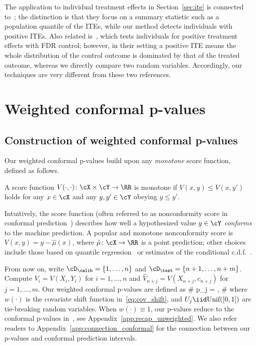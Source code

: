 The application to individual treatment effects in Section~\ref{sec:ite}
is connected to~\cite{caughey2021randomization};
the distinction is that they focus on a summary statistic such as
a population quantile of the ITEs,
while our method {detects individuals with positive ITEs.}
Also related is~\cite{duan2021interactive},
which tests individuals for positive treatment effects
with FDR control; however, in their setting a positive ITE
means the whole distribution  of
the control outcome is dominated by that of the treated outcome,
whereas we
directly compare two random variables.
Accordingly, our techniques are very different from these two references.
\section{Weighted conformal p-values}
\label{sec:pval}
\subsection{Construction of weighted conformal p-values}

Our weighted conformal p-values build upon
any \emph{monotone} score function, defined as follows.

\begin{definition}[Monotonicity]
    \label{def:monotone}
A score function $V(\cdot,\cdot)\colon \cX\times\cY\to \RR$ is monotone if
$V(x,y)\leq V(x,y')$ holds for any $x\in \cX$ and any $y,y'\in \cY$ obeying $y\leq y'$.
\end{definition}


Intuitively, the score function (often referred to as nonconformity score
in conformal prediction~\cite{vovk2005algorithmic})
describes how well a hypothesized value $y\in \cY$
\emph{conforms} to the machine prediction.
A popular and monotone nonconformity score
is $V(x,y) = y-\hat\mu(x)$, where $\hat\mu\colon\cX\to \RR$ is
a point prediction; other choices include those based on
quantile regression~\cite{romano2019conformalized} or estimates of the conditional
c.d.f.~\cite{chernozhukov2021distributional}.

{From now on, write $\cD_\calib = \{1,\dots,n\}$ and $\cD_\test=\{n+1,\dots,n+m\}$.
Compute $V_i=V(X_i,Y_i)$ for $i=1,\dots,n$  and
$\hat{V}_{n+j}=V(X_{n+j},c_{n+j})$ for $j=1,\dots,m$.
Our weighted conformal p-values are defined as
\#\label{eq:def_wcpval_rand}
p_j = ,
\#
where $w(\cdot)$ is the covariate shift function in~\eqref{eq:cov_shift},
and  $U_j\iid \textrm{Unif}([0,1])$ are tie-breaking random variables.
When $w(\cdot)\equiv 1$, our p-values reduce to the conformal p-values in~\cite{jin2022selection}, see Appendix~\ref{app:recap_unweighted}.
We also refer readers to Appendix~\ref{app:connection_conformal} for
the connection between
our p-values and conformal prediction intervals.}


